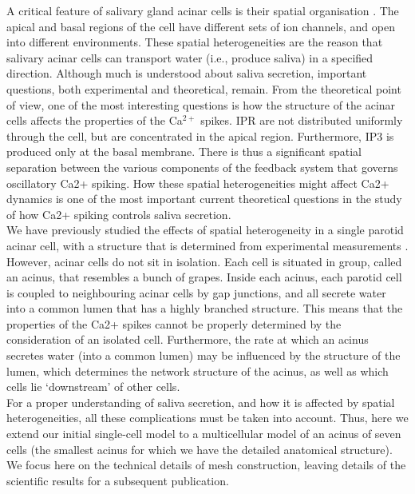 \documentclass[a4paper,10pt]{article}
\begin{document}
A critical feature of salivary gland acinar cells is their spatial organisation \cite{Sneyd2017383}. The apical and basal regions of the cell have different sets of ion channels, and open into different environments. These spatial heterogeneities are the reason that salivary acinar cells can transport water (i.e., produce saliva) in a specified direction.
Although much is understood about saliva secretion, important questions, both experimental and theoretical, remain. From the theoretical point of view, one of the most interesting questions is how the structure of the acinar cells affects the properties of the Ca$^{2+}$ spikes. IPR are not distributed uniformly through the cell, but are concentrated in the apical region. Furthermore, IP3 is produced only at the basal membrane. There is thus a significant spatial separation between the various components of the feedback system that governs oscillatory Ca2+ spiking. How these spatial heterogeneities might affect Ca2+ dynamics is one of the most important current theoretical questions in the study of how Ca2+ spiking controls saliva secretion.\\

We have previously studied the effects of spatial heterogeneity in a single parotid acinar cell, with a structure that is determined from experimental measurements \cite{sneyd2003}. However, acinar cells do not sit in isolation. Each cell is situated in group, called an acinus, that resembles a bunch of grapes. Inside each acinus, each parotid cell is coupled to neighbouring acinar cells by gap junctions, and all secrete water into a common lumen that has a highly branched structure. This means that the properties of the Ca2+ spikes cannot be properly determined by the consideration of an isolated cell. Furthermore, the rate at which an acinus secretes water (into a common lumen) may be influenced by the structure of the lumen, which determines the network structure of the acinus, as well as which cells lie `downstream' of other cells.\\

For a proper understanding of saliva secretion, and how it is affected by spatial heterogeneities, all these complications must be taken into account. Thus, here we extend our initial single-cell model to a multicellular model of an acinus of seven cells (the smallest acinus for which we have the detailed anatomical structure).
We focus here on the technical details of mesh construction, leaving details of the scientific results for a subsequent publication.\\
\end{document}

